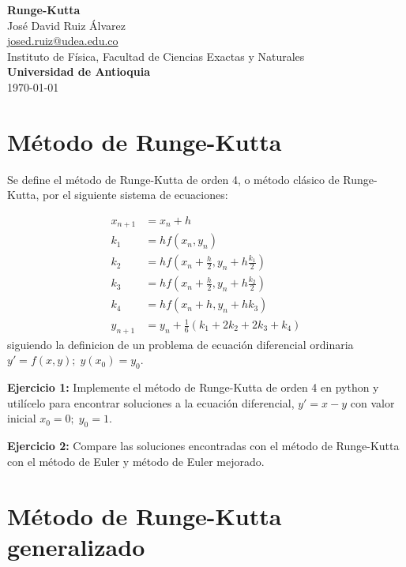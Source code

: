\documentclass[10.5pt]{article}
\begin{document}
\noindent
\begin{minipage}[b]{0.75\linewidth}
{\LARGE\bf Runge-Kutta}\\ %
\large{Jos\'{e} David Ruiz \'{A}lvarez} \\
\small{\href{mailto:josed.ruiz@udea.edu.co}{josed.ruiz@udea.edu.co}} \\ %
\normalsize{Instituto de Física, Facultad de Ciencias Exactas y Naturales} \\%
\normalsize{\bf Universidad de Antioquia} \\[8mm]
\today %
\end{minipage}%

\section{Método de Runge-Kutta}

Se define el método de Runge-Kutta de orden 4, o método clásico de Runge-Kutta, por el siguiente sistema de ecuaciones:

\begin{align}
  x_{n+1} & =  x_{n}+h \\
  k_{1} & =  hf(x_{n},y_{n}) \\
  k_{2} & =  hf(x_{n}+\frac{h}{2},y_{n}+h\frac{k_{1}}{2}) \\
  k_{3} & =  hf(x_{n}+\frac{h}{2},y_{n}+h\frac{k_{2}}{2}) \\
  k_{4} & =  hf(x_{n}+h,y_{n}+hk_{3}) \\
  y_{n+1} & =  y_{n} + \frac{1}{6}(k_{1}+2k_{2}+2k_{3}+k_{4})
\end{align}siguiendo la definicion de un problema de ecuación diferencial ordinaria $y'=f(x,y);\; y(x_{0})=y_{0}$.

{\bf Ejercicio 1:} Implemente el método de Runge-Kutta de orden 4 en python y utilícelo para encontrar soluciones a la ecuación diferencial, $y'=x-y$ con valor inicial $x_{0}=0;\; y_{0}=1$.

{\bf Ejercicio 2:} Compare las soluciones encontradas con el método de Runge-Kutta con el método de Euler y método de Euler mejorado.

\section{Método de Runge-Kutta generalizado}
\end{document}
